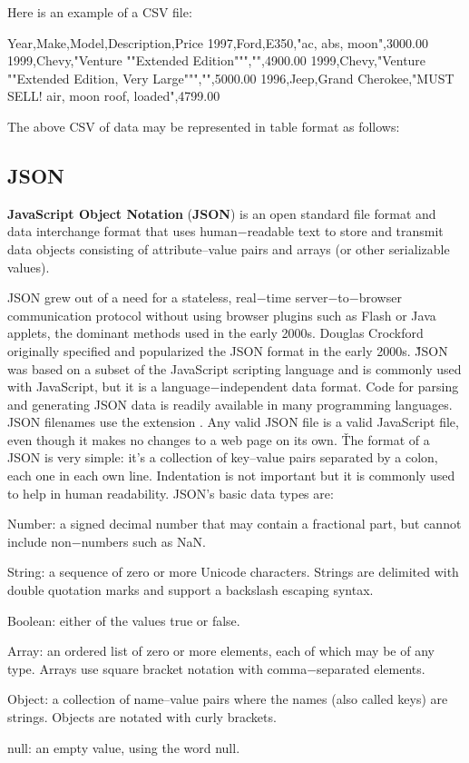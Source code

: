 Here is an example of a CSV file:

\begin{block}
Year,Make,Model,Description,Price
1997,Ford,E350,"ac, abs, moon",3000.00
1999,Chevy,"Venture ""Extended Edition""","",4900.00
1999,Chevy,"Venture ""Extended Edition, Very Large""","",5000.00
1996,Jeep,Grand Cherokee,"MUST SELL! air, moon roof, loaded",4799.00
\end{block}

The above CSV of data may be represented in table format as follows:


\subsection{JSON}


\textbf{JavaScript Object Notation} (\textbf{JSON}) is an open standard file format and data interchange format that
uses human$-$readable text to store and transmit data objects consisting of attribute–value pairs and arrays (or other
serializable values).
\ed

JSON grew out of a need for a stateless, real$-$time server$-$to$-$browser communication protocol without using
browser plugins such as Flash or Java applets, the dominant methods used in the early 2000s. Douglas Crockford
originally specified and popularized the JSON format in the early 2000s. \v

JSON was based on a subset of the JavaScript scripting language and is commonly used with JavaScript, but it is a
language$-$independent data format. Code for parsing and generating JSON data is readily available in many
programming languages. JSON filenames use the extension . Any valid JSON file is a valid JavaScript file,
even though it makes no changes to a web page on its own. \v

The format of a JSON is very simple: it's a collection of key–value pairs separated by a colon, each one in each own
line. Indentation is not important but it is commonly used to help in human readability. JSON's basic data types are:
\bit
\item Number: a signed decimal number that may contain a fractional part, but cannot include non$-$numbers such as
NaN\@.
\item String: a sequence of zero or more Unicode characters. Strings are delimited with double quotation marks and
support a backslash escaping syntax.
\item Boolean: either of the values true or false.
\item Array: an ordered list of zero or more elements, each of which may be of any type. Arrays use square bracket
notation with comma$-$separated elements.
\item Object: a collection of name–value pairs where the names (also called keys) are strings. Objects are notated with
curly brackets.
\item null: an empty value, using the word null.
\eit

